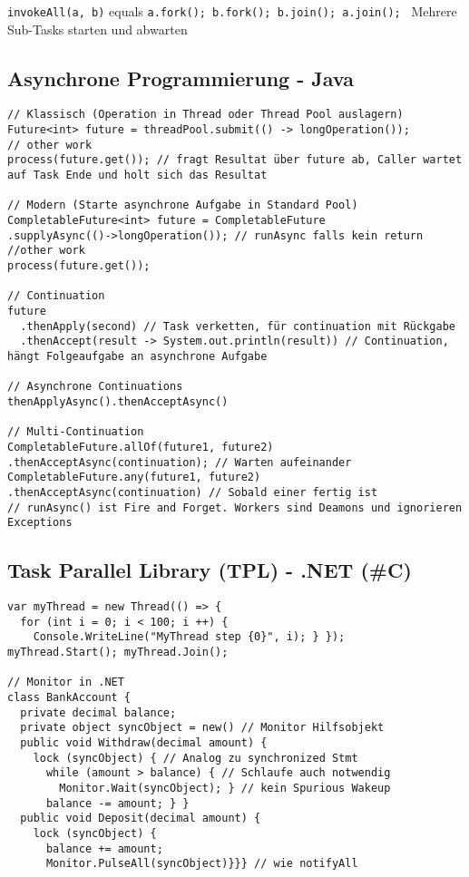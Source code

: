 \lstinline{invokeAll(a, b)} equals \lstinline{a.fork(); b.fork(); b.join(); a.join(); } Mehrere Sub-Tasks starten und abwarten

\subsection{Asynchrone Programmierung - Java}

\begin{lstlisting}
// Klassisch (Operation in Thread oder Thread Pool auslagern)
Future<int> future = threadPool.submit(() -> longOperation());
// other work
process(future.get()); // fragt Resultat über future ab, Caller wartet auf Task Ende und holt sich das Resultat

// Modern (Starte asynchrone Aufgabe in Standard Pool)
CompletableFuture<int> future = CompletableFuture
.supplyAsync(()->longOperation()); // runAsync falls kein return
//other work
process(future.get());

// Continuation
future
  .thenApply(second) // Task verketten, für continuation mit Rückgabe
  .thenAccept(result -> System.out.println(result)) // Continuation, hängt Folgeaufgabe an asynchrone Aufgabe

// Asynchrone Continuations
thenApplyAsync().thenAcceptAsync()

// Multi-Continuation
CompletableFuture.allOf(future1, future2)
.thenAcceptAsync(continuation); // Warten aufeinander
CompletableFuture.any(future1, future2)
.thenAcceptAsync(continuation) // Sobald einer fertig ist
// runAsync() ist Fire and Forget. Workers sind Deamons und ignorieren Exceptions
\end{lstlisting}

\subsection{Task Parallel Library (TPL) - .NET (\#C)}


\begin{lstlisting}
var myThread = new Thread(() => {
  for (int i = 0; i < 100; i ++) {
    Console.WriteLine("MyThread step {0}", i); } });
myThread.Start(); myThread.Join();

// Monitor in .NET
class BankAccount {
  private decimal balance;
  private object syncObject = new() // Monitor Hilfsobjekt
  public void Withdraw(decimal amount) {
    lock (syncObject) { // Analog zu synchronized Stmt
      while (amount > balance) { // Schlaufe auch notwendig
        Monitor.Wait(syncObject); } // kein Spurious Wakeup
      balance -= amount; } }
  public void Deposit(decimal amount) {
    lock (syncObject) {
      balance += amount;
      Monitor.PulseAll(syncObject)}}} // wie notifyAll
\end{lstlisting}


